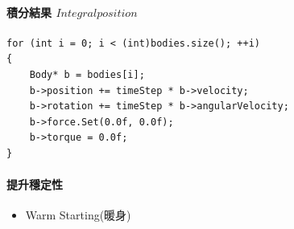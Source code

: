 \paragraph{積分結果 \(Integral position\)}

\begin{itemize}
\end{itemize}

\begin{lstlisting}  
for (int i = 0; i < (int)bodies.size(); ++i)
{
    Body* b = bodies[i];
    b->position += timeStep * b->velocity;
    b->rotation += timeStep * b->angularVelocity;
    b->force.Set(0.0f, 0.0f);
    b->torque = 0.0f;
}
\end{lstlisting}

\paragraph{提升穩定性}

\begin{itemize}
\item{Warm Starting(暖身)}
\end{itemize}

